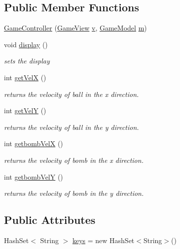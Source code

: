 \subsection*{Public Member Functions}
\begin{DoxyCompactItemize}
\item 
\hyperlink{classstart_game_1_1_game_controller_aecc647e49ed23b571160d7d7c68b04d7}{Game\+Controller} (\hyperlink{classview_1_1_game_view}{Game\+View} \hyperlink{classstart_game_1_1_game_controller_a86e3c6ba6e8d0ecb0946da48fa55e7ee}{v}, \hyperlink{classmodel_1_1_game_model}{Game\+Model} \hyperlink{classstart_game_1_1_game_controller_a2c79234f85f979b8f1efe5a48893560d}{m})
\item 
void \hyperlink{classstart_game_1_1_game_controller_abe07c8d60c3adbb0993e637b8c725884}{display} ()
\begin{DoxyCompactList}\small\item\em sets the display \end{DoxyCompactList}\item 
int \hyperlink{classstart_game_1_1_game_controller_a2170345005b5f2f453951dd7b4691e0f}{get\+VelX} ()
\begin{DoxyCompactList}\small\item\em returns the velocity of ball in the x direction. \end{DoxyCompactList}\item 
int \hyperlink{classstart_game_1_1_game_controller_a03bc4dfd9bc501924f18e7f9f49361db}{get\+VelY} ()
\begin{DoxyCompactList}\small\item\em returns the velocity of ball in the y direction. \end{DoxyCompactList}\item 
int \hyperlink{classstart_game_1_1_game_controller_a1b902c1d6b489b6499c340b1db67e868}{getbomb\+VelX} ()
\begin{DoxyCompactList}\small\item\em returns the velocity of bomb in the x direction. \end{DoxyCompactList}\item 
int \hyperlink{classstart_game_1_1_game_controller_a8996d95affa45808c489767da11b6622}{getbomb\+VelY} ()
\begin{DoxyCompactList}\small\item\em returns the velocity of bomb in the y direction. \end{DoxyCompactList}\end{DoxyCompactItemize}
\subsection*{Public Attributes}
\begin{DoxyCompactItemize}
\item 
Hash\+Set$<$ String $>$ \hyperlink{classstart_game_1_1_game_controller_afed267a642ca7f3ec1c1074fec2996dd}{keys} = new Hash\+Set$<$String$>$()
\end{DoxyCompactItemize}
